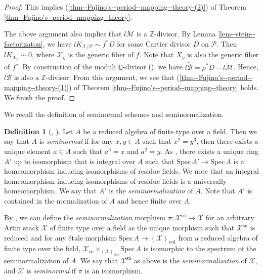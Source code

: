 \documentclass[12pt,twoside]{amsart}
\theoremstyle{definition}
\newtheorem{defn}[thm]{Definition}
\begin{document}
\begin{proof}
This implies (\ref{thm--Fujino's--period--mapping--theory-(2)}) of Theorem \ref{thm--Fujino's--period--mapping--theory}. 

The above argument also implies that $l\widetilde{\mathcal{M}}$ is a $\mathbb{Z}$-divisor. 
By Lemma \ref{lem--stein--factorizaton}, we have $lK_{\mathcal{X}/\mathcal{P}} \sim f^{*}D$ for some Cartier divisor $D$ on $\mathcal{P}$. 
Then $lK_{\mathcal{X}_{\eta}}\sim0$, where $\mathcal{X}_{\eta}$ is the generic fiber of $f$. 
Note that $X_{\eta}$ is also the generic fiber of $f^{c}$. 
By construction of the moduli $\mathbb{Q}$-divisor (\cite{FM2}), we have
$l\widetilde{\mathcal{B}}=\rho^{*}D-l\widetilde{\mathcal{M}}$. 
Hence, $l\widetilde{\mathcal{B}}$ is also a $\mathbb{Z}$-divisor. 
From this argument, we see that (\ref{thm--Fujino's--period--mapping--theory-(1)}) of Theorem \ref{thm--Fujino's--period--mapping--theory} holds. 
We finish the proof.  
\end{proof}

We recall the definition of seminormal schemes and seminormalization.

\begin{defn}[{\cite[Tag 0EUL]{stacksproject-chap98}, \cite{GT}}]\label{def-seminormal}
Let $A$ be a reduced algebra of finite type over a field.
Then we say that $A$ is {\it seminormal} if for any $x,y\in A$ such that $x^2=y^3$, then there exists a unique element $a\in A$ such that $a^3=x$ and $a^2=y$.
As \cite[Tag 0EUR]{stacksproject-chap98}, there exists a unique ring $A'$ up to isomorphism that is integral over $A$ such that $\mathrm{Spec}\,A'\to \mathrm{Spec}\,A$ is a homeomorphism inducing isomorphisms of residue fields.
We note that an integral homeomorphism inducing isomorphisms of residue fields is a universally homeomorphism.
We say that $A'$ is the {\it seminormalization} of $A$.
Note that $A'$ is contained in the normalization of $A$ and hence finite over $A$.

By \cite[Theorems 1.6 and 4.1]{GT}, we can define the {\it seminormalization} morphism $\pi\colon \mathscr{X}^{\mathrm{sn}}\to \mathscr{X}$ for an arbitrary Artin stack $\mathscr{X}$ of finite type over a field as the unique morphism such that $\mathscr{X}^{\mathrm{sn}}$ is reduced and for any \'etale morphism $\mathrm{Spec}\,A\to (\mathscr{X})_{\mathrm{red}}$ from a reduced algebra of finite type over the field, $\mathscr{X}_{\mathrm{sn}}\times_{(\mathscr{X})_{\mathrm{red}}}\mathrm{Spec}\,A$ is isomorphic to the spectrum of the seminormalization of $A$. 
We say that $\mathscr{X}^{\mathrm{sn}}$ as above is the {\it seminormalization} of $\mathscr{X}$, and $\mathscr{X}$ is {\it seminormal} if $\pi$ is an isomorphism. 
\end{defn}
\end{document}
